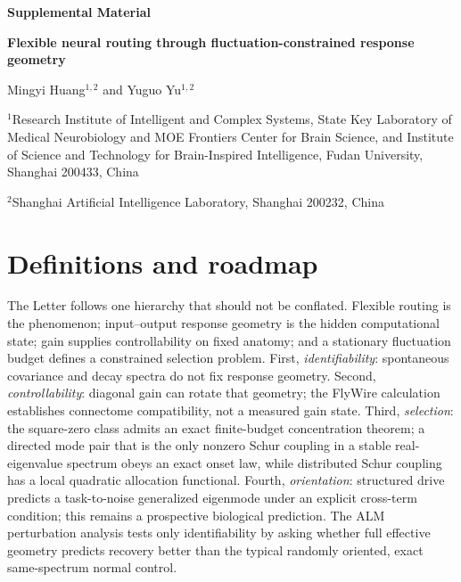 \documentclass[
  aps,prl,preprint,notitlepage,superscriptaddress,nofootinbib,longbibliography,
  amsmath,amssymb
]{revtex4-2}
\begin{document}
\begin{center}
{\large\bfseries Supplemental Material\par}
\vspace{0.35em}
{\large\bfseries Flexible neural routing through fluctuation-constrained
response geometry\par}
\vspace{0.8em}
Mingyi Huang$^{1,2}$ and Yuguo Yu$^{1,2}$\par
\vspace{0.35em}
{\small
$^1$Research Institute of Intelligent and Complex Systems, State Key
Laboratory of Medical Neurobiology and MOE Frontiers Center for Brain Science,
and Institute of Science and Technology for Brain-Inspired Intelligence,
Fudan University, Shanghai 200433, China\par
$^2$Shanghai Artificial Intelligence Laboratory, Shanghai 200232, China\par}
\end{center}
\vspace{0.6em}

\begingroup
\small
\sloppy
\tableofcontents
\endgroup

\section{Definitions and roadmap}

The Letter follows one hierarchy that should not be conflated.  Flexible
routing is the phenomenon; input--output response geometry is the hidden
computational state; gain supplies controllability on fixed anatomy; and a
stationary fluctuation budget defines a constrained selection problem.  First,
\emph{identifiability}: spontaneous covariance and decay spectra do not fix
response geometry.  Second, \emph{controllability}: diagonal gain can rotate
that geometry; the FlyWire calculation establishes connectome compatibility,
not a measured gain state.  Third, \emph{selection}: the square-zero class
admits an exact finite-budget concentration theorem; a directed mode pair that
is the only nonzero Schur coupling in a stable real-eigenvalue spectrum obeys
an exact onset law, while distributed
Schur coupling has a local quadratic allocation functional.  Fourth,
\emph{orientation}: structured drive predicts a task-to-noise generalized
eigenmode under an explicit cross-term condition; this remains a prospective
biological prediction.  The ALM perturbation analysis tests only
identifiability by asking whether full effective geometry predicts recovery
better than the typical randomly oriented, exact same-spectrum normal control.
\end{document}
